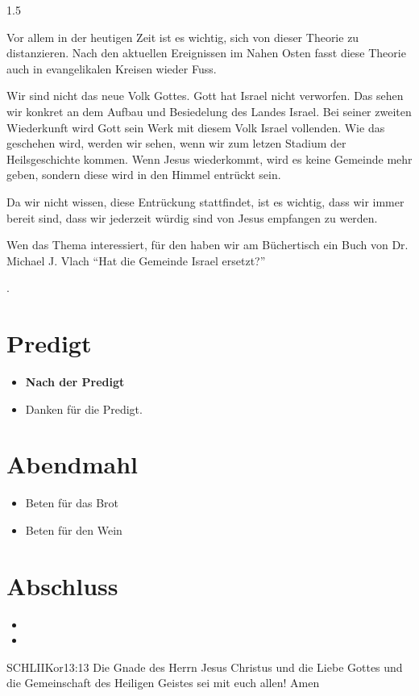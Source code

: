 \documentclass[fontsize=14pt]{../../inc/mybib}
\begin{document}
\begin{spacing}{1.5}
\begin{block}
        Vor allem in der heutigen Zeit ist es wichtig, sich von dieser Theorie zu distanzieren. Nach den aktuellen Ereignissen im Nahen Osten fasst diese Theorie auch in evangelikalen Kreisen wieder Fuss.
    \end{block}
    \begin{block}[Schlussfolgerung]
        Wir sind nicht das neue Volk Gottes. Gott hat Israel nicht verworfen. Das sehen wir konkret an dem Aufbau und Besiedelung des Landes Israel. Bei seiner zweiten Wiederkunft wird Gott sein Werk mit diesem Volk Israel vollenden. Wie das geschehen wird, werden wir sehen, wenn wir zum letzen Stadium der Heilsgeschichte kommen. Wenn Jesus wiederkommt, wird es keine Gemeinde mehr geben, sondern diese wird in den Himmel entrückt sein.

        Da wir nicht wissen,  diese Entrückung stattfindet, ist es wichtig, dass wir immer bereit sind, dass wir jederzeit würdig sind von Jesus empfangen zu werden. 

        Wen das Thema interessiert, für den haben wir am Büchertisch ein Buch von Dr. Michael J. Vlach \enquote{Hat die Gemeinde Israel ersetzt?} 
        
    \end{block}



    .

\end{spacing}

\section{Predigt}
\begin{itemize}
\item[] \textbf{Nach der Predigt}
\item[] Danken für die Predigt.
\end{itemize}

\section{Abendmahl}
\begin{itemize}
\item[] Beten für das Brot
\item[] Beten für den Wein
\end{itemize}

\section{Abschluss}
\begin{itemize}
\item[] 
\item[] \beten{}
\end{itemize}

\begin{bibelbox}{SCHL}{IIKor}{13:13}
    Die Gnade des Herrn Jesus Christus und die Liebe Gottes und die Gemeinschaft des Heiligen Geistes sei mit euch allen! Amen
\end{bibelbox}
\end{document}
